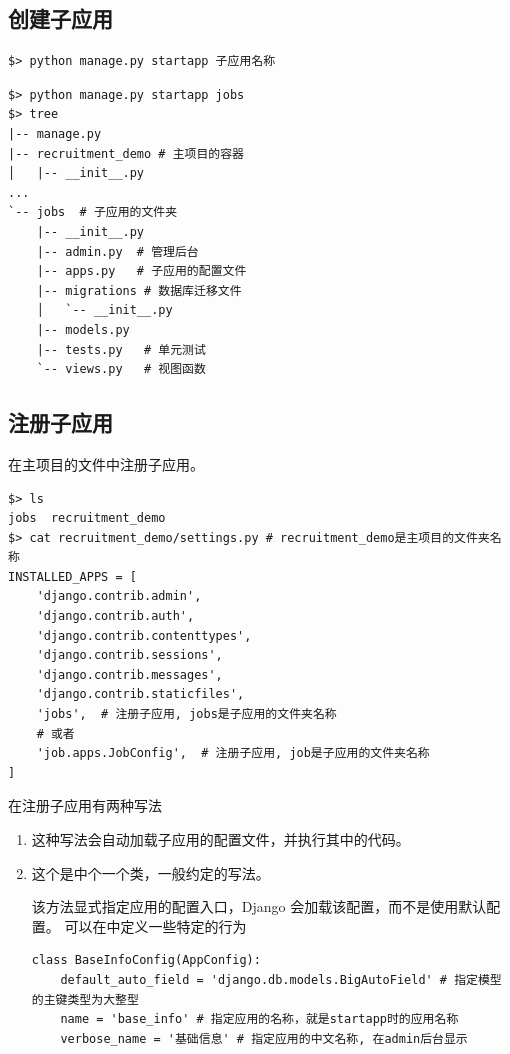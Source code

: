 \subsection{创建子应用}
\begin{lstlisting}[style=demostyle,numbers=none]
$> python manage.py startapp 子应用名称
\end{lstlisting}

\begin{lstlisting}[style=demostyle,numbers=none]
$> python manage.py startapp jobs
$> tree
|-- manage.py
|-- recruitment_demo # 主项目的容器
│   |-- __init__.py
...
`-- jobs  # 子应用的文件夹
    |-- __init__.py
    |-- admin.py  # 管理后台
    |-- apps.py   # 子应用的配置文件
    |-- migrations # 数据库迁移文件
    │   `-- __init__.py
    |-- models.py
    |-- tests.py   # 单元测试
    `-- views.py   # 视图函数
\end{lstlisting}

\subsection{注册子应用}
在主项目的文件中注册子应用。
\begin{lstlisting}[style=demostyle,numbers=none]
$> ls 
jobs  recruitment_demo  
$> cat recruitment_demo/settings.py # recruitment_demo是主项目的文件夹名称  
INSTALLED_APPS = [
    'django.contrib.admin',
    'django.contrib.auth',
    'django.contrib.contenttypes',
    'django.contrib.sessions',
    'django.contrib.messages',
    'django.contrib.staticfiles',
    'jobs',  # 注册子应用, jobs是子应用的文件夹名称
    # 或者
    'job.apps.JobConfig',  # 注册子应用, job是子应用的文件夹名称
]
\end{lstlisting}

在注册子应用有两种写法
\begin{enumerate}[label=\arabic*)]
  \item {}

  这种写法会自动加载子应用的配置文件，并执行其中的代码。

  \item {}

  这个是中个一个类，一般约定的写法。

  该方法显式指定应用的配置入口，Django 会加载该配置，而不是使用默认配置。
  可以在中定义一些特定的行为
\begin{lstlisting}[style=demostyle,numbers=none]
class BaseInfoConfig(AppConfig):
    default_auto_field = 'django.db.models.BigAutoField' # 指定模型的主键类型为大整型
    name = 'base_info' # 指定应用的名称，就是startapp时的应用名称
    verbose_name = '基础信息' # 指定应用的中文名称, 在admin后台显示
\end{lstlisting}    

\end{enumerate}



